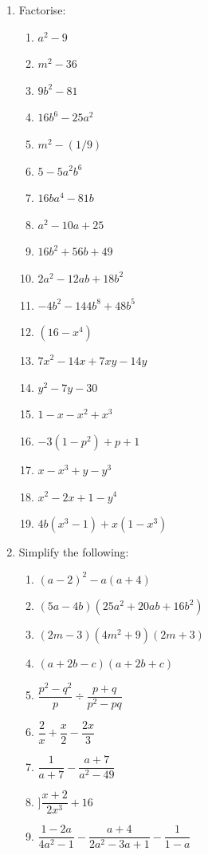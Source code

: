 \begin{eocexercises}{}
\begin{enumerate}[itemsep=5pt, label=\textbf{\arabic*}. ]
\item Factorise:
\begin{multicols}{2}
\begin{enumerate}[itemsep=5pt, label=\textbf{\alph*}. ] 
\item ${a}^{2}-9$
\item ${m}^{2}-36$
\item $9{b}^{2}-81$
\item $16{b}^{6}-25{a}^{2}$
\item ${m}^{2}-\left(1/9\right)$
\item $5-5{a}^{2}{b}^{6}$
\item $16b{a}^{4}-81b$
\item ${a}^{2}-10a+25$
\item $16{b}^{2}+56b+49$
\item $2{a}^{2}-12ab+18{b}^{2}$
\item $-4{b}^{2}-144{b}^{8}+48{b}^{5}$
\item $(16-{x}^{4})$
\item ${7x}^{2}-14x+7xy-14y$
\item ${y}^{2}-7y-30$
\item $1-x-{x}^{2}+{x}^{3}$
\item $-3(1-{p}^{2})+p+1$
\item $x-x^{3} + y - y^{3}$
\item $x^{2} - 2x + 1 - y^{4}$
\item $4b(x^{3} - 1) + x(1-x^{3})$
\end{enumerate}
\end{multicols}


\item Simplify the following:
\begin{enumerate}[itemsep=5pt, label=\textbf{\alph*}. ] 
\item ${(a-2)}^{2}-a(a+4)$
\item $(5a-4b)(25{a}^{2}+20ab+16{b}^{2})$
\item $(2m-3)(4{m}^{2}+9)(2m+3)$
\item $(a+2b-c)(a+2b+c)$
\item $\dfrac{{p}^{2}-{q}^{2}}{p}÷\dfrac{p+q}{{p}^{2}-pq}$
\item $\dfrac{2}{x}+\dfrac{x}{2}-\dfrac{2x}{3}$
\item $\dfrac{1}{a+7}-\dfrac{a+7}{a^{2}-49}$
\item $]\dfrac{x+2}{2x^{3}} + 16$
\item $\dfrac{1-2a}{4a^{2} -1} - \dfrac{a+4}{2a^{2}-3a+1} - \dfrac{1}{1-a}$
\end{enumerate}



\end{enumerate}
\end{eocexercises}
